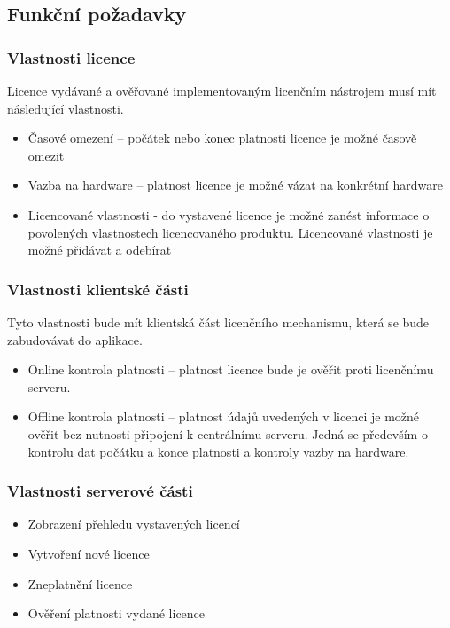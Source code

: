 \subsection{Funkční požadavky}

\subsubsection*{Vlastnosti licence}

Licence vydávané a ověřované implementovaným licenčním nástrojem musí mít
následující vlastnosti.

\begin{itemize}
  \item Časové omezení – počátek nebo konec platnosti licence je možné časově
  omezit
  \item Vazba na hardware – platnost licence je možné vázat na konkrétní
  hardware
  \item Licencované vlastnosti - do vystavené licence je možné zanést
  informace o povolených vlastnostech licencovaného produktu. Licencované
  vlastnosti je možné přidávat a odebírat
\end{itemize}

\subsubsection*{Vlastnosti klientské části}

Tyto vlastnosti bude mít klientská část licenčního mechanismu, která se bude
zabudovávat do aplikace.

\begin{itemize}
  \item Online kontrola platnosti – platnost licence bude je ověřit proti
  licenčnímu serveru.
  \item Offline kontrola platnosti – platnost údajů uvedených v licenci je
  možné ověřit bez nutnosti připojení k centrálnímu serveru. Jedná se především
  o kontrolu dat počátku a konce platnosti a kontroly vazby na hardware.
\end{itemize}

\subsubsection*{Vlastnosti serverové části}

\begin{itemize}
  \item Zobrazení přehledu vystavených licencí
  \item Vytvoření nové licence
  \item Zneplatnění licence
  \item Ověření platnosti vydané licence
\end{itemize}

